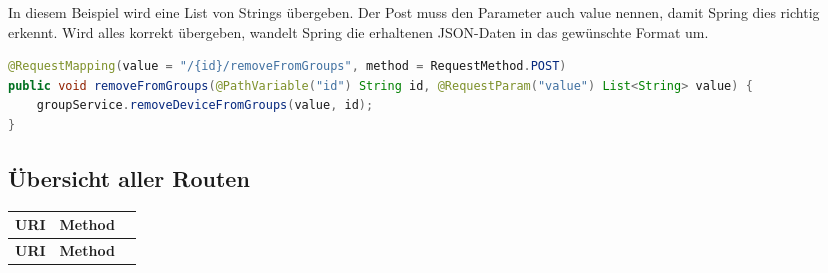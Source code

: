 In diesem Beispiel wird eine List von Strings übergeben. Der Post muss den Parameter auch value nennen, damit Spring dies richtig erkennt. Wird alles korrekt übergeben, wandelt Spring die erhaltenen JSON-Daten in das gewünschte Format um.
\begin{lstlisting}[language=java]
@RequestMapping(value = "/{id}/removeFromGroups", method = RequestMethod.POST)
public void removeFromGroups(@PathVariable("id") String id, @RequestParam("value") List<String> value) {
	groupService.removeDeviceFromGroups(value, id);
}
\end{lstlisting}
\subsection{Übersicht aller Routen}
\begin{longtable}{ p{11cm} p{4cm} l}
\hline 
\multicolumn{1}{p{11cm}}{\textbf{URI}} & 
\multicolumn{1}{p{4cm}}{\textbf{Method}} &  \\ \hline 
\endfirsthead

\hline 
\multicolumn{1}{p{11cm}}{\textbf{URI}} & 
\multicolumn{1}{p{4cm}}{\textbf{Method}} &  \\ \hline 
\endhead


\end{longtable}
